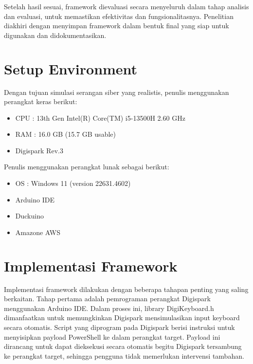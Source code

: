 Setelah hasil sesuai, framework dievaluasi secara menyeluruh dalam tahap analisis dan evaluasi, untuk memastikan efektivitas dan fungsionalitasnya. Penelitian diakhiri dengan menyimpan framework dalam bentuk final yang siap untuk digunakan dan didokumentasikan.

\section{Setup Environment}
Dengan tujuan simulasi serangan siber yang realistis, penulis menggunakan perangkat keras berikut:
\begin{itemize}
    \item CPU   : 13th Gen Intel(R) Core(TM) i5-13500H   2.60 GHz
    \item RAM   : 16.0 GB (15.7 GB usable)
    \item Digispark Rev.3

\end{itemize}

Penulis menggunakan perangkat lunak sebagai berikut:
\begin{itemize}
    \item OS    : Windows 11 (version 22631.4602)
    \item Arduino IDE
    \item Duckuino
    \item Amazone AWS

\end{itemize}


\section{Implementasi Framework}
Implementasi framework dilakukan dengan beberapa tahapan penting yang saling berkaitan. Tahap pertama adalah pemrograman perangkat Digispark menggunakan Arduino IDE. Dalam proses ini, library DigiKeyboard.h dimanfaatkan untuk memungkinkan Digispark mensimulasikan input keyboard secara otomatis. Script yang diprogram pada Digispark berisi instruksi untuk menyisipkan payload PowerShell ke dalam perangkat target. Payload ini dirancang untuk dapat dieksekusi secara otomatis begitu Digispark tersambung ke perangkat target, sehingga pengguna tidak memerlukan intervensi tambahan.

